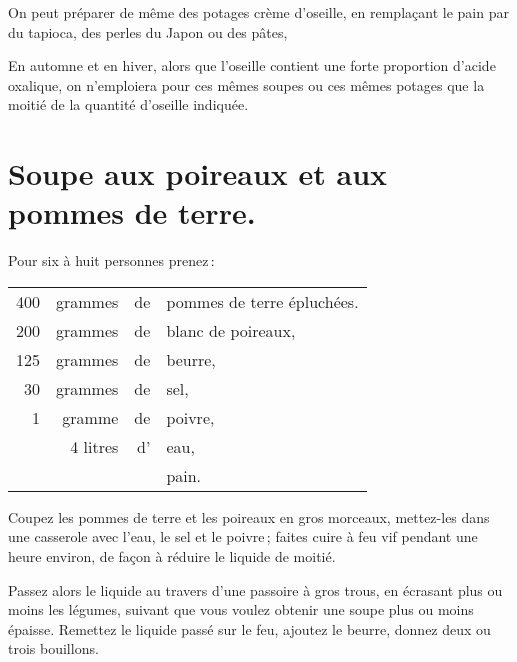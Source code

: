 On peut préparer de même des potages crème d'oseille, en remplaçant le pain par
du tapioca, des perles du Japon ou des pâtes,

\sk

En automne et en hiver, alors que l'oseille contient une forte proportion
d'acide oxalique, on n'emploiera pour ces mêmes soupes ou ces mêmes potages que
la moitié de la quantité d'oseille indiquée.

\section*{\centering Soupe aux poireaux et aux pommes de terre.}

Pour six à huit personnes prenez :

\medskip

\footnotesize
\begin{longtable}{rrrp{16em}}                                                    
    400 & grammes     & de & pommes de terre épluchées.                                                   \\
    200 & grammes     & de & blanc de poireaux,                                                           \\
    125 & grammes     & de & beurre,                                                                      \\
     30 & grammes     & de & sel,                                                                         \\
      1 & gramme      & de & poivre,                                                                      \\
        & 4 litres    & d’ & eau,                                                                         \\
        &             &    &pain.                                                                         \\
\end{longtable}
\normalsize
                                                       
Coupez les pommes de terre et les poireaux en gros morceaux, mettez-les dans
une casserole avec l'eau, le sel et le poivre ; faites cuire à feu vif pendant
une heure environ, de façon à réduire le liquide de moitié.

Passez alors le liquide au travers d'une passoire à gros trous, en écrasant plus ou
moins les légumes, suivant que vous voulez obtenir une soupe plus ou moins
épaisse. Remettez le liquide passé sur le feu, ajoutez le beurre, donnez deux ou
trois bouillons.

